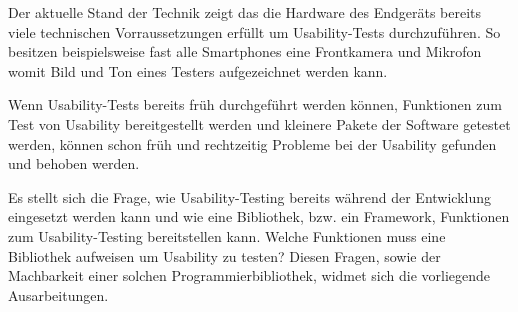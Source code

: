 Der aktuelle Stand der Technik zeigt das die Hardware des Endgeräts bereits viele technischen Vorraussetzungen erfüllt um Usability-Tests durchzuführen. So besitzen beispielsweise fast alle Smartphones eine Frontkamera und Mikrofon womit Bild und Ton eines Testers aufgezeichnet werden kann. 

Wenn Usability-Tests bereits früh durchgeführt werden können, Funktionen zum Test von Usability bereitgestellt werden und kleinere Pakete der Software getestet werden, können schon früh und rechtzeitig Probleme bei der Usability gefunden und behoben werden.

Es stellt sich die Frage, wie Usability-Testing bereits während der Entwicklung eingesetzt werden kann und wie eine Bibliothek, bzw. ein Framework, Funktionen zum Usability-Testing bereitstellen kann. Welche Funktionen muss eine Bibliothek aufweisen um Usability zu testen? Diesen Fragen, sowie der Machbarkeit einer solchen Programmierbibliothek, widmet sich die vorliegende Ausarbeitungen. 




\cite{usabilityEngineeringKompakt}

\cite{nodejs_therightway}